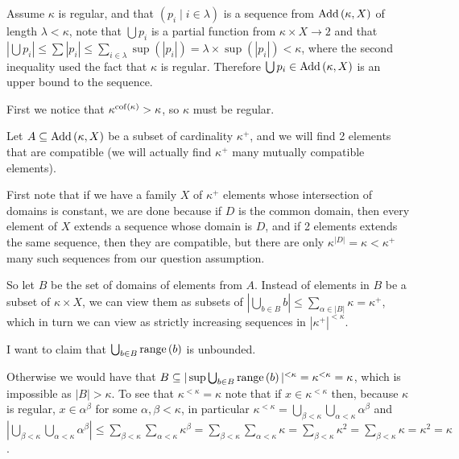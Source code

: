\begin{cExercise}
	\begin{cPart}
		Assume $\kappa$ is regular, and that $(p_i\mid i\in\lambda)$ is a sequence from $\operatorname{Add}\left(\kappa,X\right)$ of length $\lambda<\kappa$, note that $\bigcup p_i$ is a partial function from $\kappa\times X\to 2$ and that $|\bigcup p_i|\le \sum |p_i|\le \sum_{i\in\lambda}\sup(|p_i|)=\lambda\times \sup(|p_i|)<\kappa$, where the second inequality used the fact that $\kappa$ is regular. Therefore $\bigcup p_i\in \operatorname{Add}\left(\kappa,X\right)$ is an upper bound to the sequence.
	\end{cPart}
	\begin{cPart}
		First we notice that $\kappa^{\operatorname{cof}\left(\kappa\right)}>\kappa$, so $\kappa$ must be regular.
		
		Let $A\subseteq \operatorname{Add}\left(\kappa,X\right)$ be a subset of cardinality $\kappa^+$, and we will find 2 elements that are compatible (we will actually find $\kappa^+$ many mutually compatible elements).
		
		First note that if we have a family $X$ of $\kappa^+$ elements whose intersection of domains is constant, we are done because if $D$ is the common domain, then every element of $X$ extends a sequence whose domain is $D$, and if 2 elements extends the same sequence, then they are compatible, but there are only $\kappa^{|D|}=\kappa<\kappa^+$ many such sequences from our question assumption.
		
		So let $B$ be the set of domains of elements from $A$. Instead of elements in $B$ be a subset of $\kappa\times X$, we can view them as subsets of $|\bigcup_{b\in B} b|\le \sum_{\alpha\in |B|}\kappa=\kappa^+$, which in turn we can view as strictly increasing sequences in $|\kappa^+|^{<\kappa}$.
		
		I want to claim that $\bigcup_{b\in B}\operatorname{range}\left(b\right)$ is unbounded.
		
		Otherwise we would have that $B\subseteq |\sup\bigcup_{b\in B}\operatorname{range}\left(b\right)|^{<\kappa}=\kappa^{<\kappa}=\kappa$, which is impossible as $|B|>\kappa$. To see that $\kappa^{<\kappa}=\kappa$ note that if $x\in\kappa^{<\kappa}$ then, because $\kappa$ is regular, $x\in\alpha^{\beta}$ for some $\alpha,\beta<\kappa$, in particular $\kappa^{<\kappa}=\bigcup_{\beta<\kappa}\bigcup_{\alpha<\kappa}\alpha^\beta$ and $|\bigcup_{\beta<\kappa}\bigcup_{\alpha<\kappa}\alpha^\beta|\le \sum_{\beta<\kappa}\sum_{\alpha<\kappa} \kappa^\beta=\sum_{\beta<\kappa}\sum_{\alpha<\kappa} \kappa=\sum_{\beta<\kappa}\kappa^2=\sum_{\beta<\kappa}\kappa=\kappa^2=\kappa$.
		

\end{cPart}
\end{cExercise}
